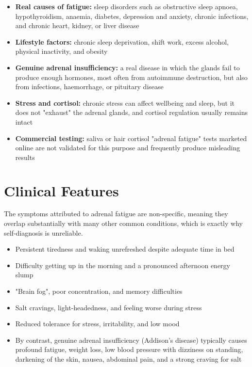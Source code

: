 \begin{itemize}
    \item \textbf{Real causes of fatigue:} sleep disorders such as obstructive sleep apnoea, hypothyroidism, anaemia, diabetes, depression and anxiety, chronic infections, and chronic heart, kidney, or liver disease
    \item \textbf{Lifestyle factors:} chronic sleep deprivation, shift work, excess alcohol, physical inactivity, and obesity
    \item \textbf{Genuine adrenal insufficiency:} a real disease in which the glands fail to produce enough hormones, most often from autoimmune destruction, but also from infections, haemorrhage, or pituitary disease
    \item \textbf{Stress and cortisol:} chronic stress can affect wellbeing and sleep, but it does not "exhaust" the adrenal glands, and cortisol regulation usually remains intact
    \item \textbf{Commercial testing:} saliva or hair cortisol "adrenal fatigue" tests marketed online are not validated for this purpose and frequently produce misleading results
\end{itemize}

\section*{Clinical Features}
The symptoms attributed to adrenal fatigue are non-specific, meaning they overlap substantially with many other common conditions, which is exactly why self-diagnosis is unreliable.

\begin{itemize}
    \item Persistent tiredness and waking unrefreshed despite adequate time in bed
    \item Difficulty getting up in the morning and a pronounced afternoon energy slump
    \item "Brain fog", poor concentration, and memory difficulties
    \item Salt cravings, light-headedness, and feeling worse during stress
    \item Reduced tolerance for stress, irritability, and low mood
    \item By contrast, genuine adrenal insufficiency (Addison's disease) typically causes profound fatigue, weight loss, low blood pressure with dizziness on standing, darkening of the skin, nausea, abdominal pain, and a strong craving for salt
\end{itemize}

